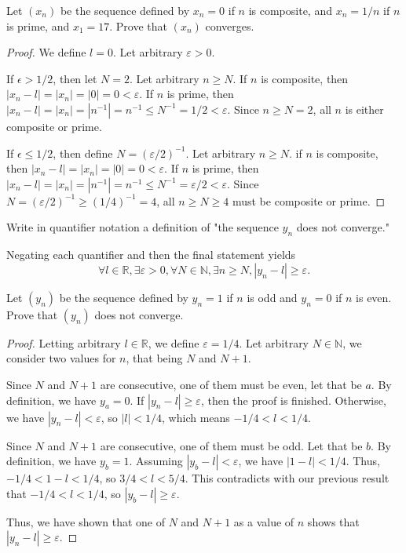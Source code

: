 \documentclass[12pt]{article}
\begin{document}
\begin{subquestion}
    Let $(x_n)$ be the sequence defined by $x_n = 0$ if $n$ is composite,
    and $x_n = 1/n$ if $n$ is prime, and $x_1 = 17$.
    Prove that $(x_n)$ converges.
\end{subquestion}
\begin{proof}
    We define $l = 0$. Let arbitrary $\varepsilon > 0$.

    If $\epsilon > 1/2$, then let $N = 2$.
    Let arbitrary $n \ge N$.
    If $n$ is composite, then $|x_n - l| = |x_n| = |0| = 0 < \varepsilon$.
    If $n$ is prime, then $|x_n - l| = |x_n| = |n^{-1}| = n^{-1} \le N^{-1} = 1/2 < \varepsilon$.
    Since $n \ge N = 2$, all $n$ is either composite or prime.
    
    If $\epsilon \le 1/2$, then define $N=(\varepsilon/2)^{-1}$.
    Let arbitrary $n \ge N$.
    if $n$ is composite, then $|x_n - l| = |x_n| = |0| = 0 < \varepsilon$.
    If $n$ is prime, then $|x_n - l| = |x_n| = |n^{-1}| = n^{-1} \le N^{-1} = \varepsilon/2 < \varepsilon$.
    Since $N = (\varepsilon/2)^{-1} \ge (1/4)^{-1} = 4$, all
    $n \ge N \ge 4$ must be composite or prime.
\end{proof}

\begin{subquestion}
    Write in quantifier notation a definition of
    "the sequence $y_n$ does not converge."
\end{subquestion}

Negating each quantifier and then the final statement yields
\[
\forall l \in \mathbb{R}, \exists \varepsilon > 0, \forall N \in \mathbb{N}, \exists n \ge N, |y_n - l| \ge \varepsilon.
\]

\begin{subquestion}
    Let $(y_n)$ be the sequence defined by $y_n = 1$ if $n$ is odd and
    $y_n = 0$ if $n$ is even. Prove that $(y_n)$ does not converge.
\end{subquestion}

\begin{proof}
    Letting arbitrary $l \in \mathbb{R}$, we define $\varepsilon = 1/4$.
    Let arbitrary $N \in \mathbb{N}$, 
    we consider two values for $n$, that being $N$ and $N+1$.

    Since $N$ and $N+1$ are consecutive, one of them must be even, let that be $a$.
    By definition, we have $y_a = 0$.
    If $|y_n - l| \ge \varepsilon$, then the proof is finished.
    Otherwise, we have $|y_n - l| < \varepsilon$, so $|l| < 1/4$, 
    which means $-1/4 < l < 1/4$.

    Since $N$ and $N+1$ are consecutive, one of them must be odd. Let that be $b$.
    By definition, we have $y_b = 1$.
    Assuming $|y_b - l| < \varepsilon$, we have $|1 - l| < 1/4$.
    Thus, $-1/4 < 1 - l < 1/4$, so $3/4 < l < 5/4$.
    This contradicts with our previous result that $-1/4 < l < 1/4$,
    so $|y_b - l| \ge \varepsilon$.

    Thus, we have shown that one of $N$ and $N+1$ as a value of $n$
    shows that $|y_n -l| \ge \varepsilon$.
\end{proof}
\end{document}
